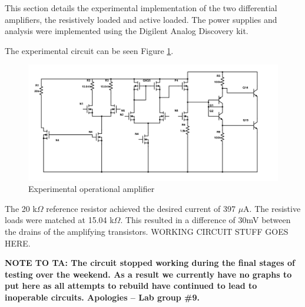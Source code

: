 




This section details the experimental implementation of the two differential amplifiers, the resistively loaded and active loaded. The power supplies and analysis were implemented using the Digilent Analog Discovery kit.

The experimental circuit can be seen Figure \ref{fig:expercircuit}.

\begin{figure}[H]
	\begin{center}
		\includegraphics[scale=.30]{ExperimentalImplementation/task4.png}
		\caption{Experimental operational amplifier}
		\label{fig:expercircuit}
	\end{center}
\end{figure}
The 20 k$\Omega$ reference resistor achieved the desired current of 397 $\mu$A. The resistive loads were matched at 15.04 k$\Omega$.  This resulted in a difference of 30mV between the drains of the amplifying transistors. WORKING CIRCUIT STUFF GOES HERE.

\textbf{NOTE TO TA: The circuit stopped working during the final stages of testing over the weekend. As a result we currently have no graphs to put here as all attempts to rebuild
	have continued to lead to inoperable circuits. Apologies -- Lab group \#9.}
	



